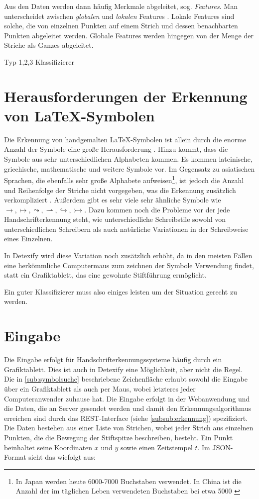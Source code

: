 Aus den Daten werden dann häufig Merkmale abgeleitet, sog. \emph{Features}. Man unterscheidet zwischen \emph{globalen} und \emph{lokalen} Features \cite{Tapia:2007p9160}. Lokale Features sind solche, die von einzelnen Punkten auf einem Strich und dessen benachbarten Punkten abgeleitet werden. Globale Features werden hingegen von der Menge der Striche als Ganzes abgeleitet.

\TODO Typ 1,2,3 Klassifizierer

\section[Herausforderungen]{Herausforderungen der Erkennung von \LaTeX-Symbolen}\label{sec:herausforderungen} Die Erkennung von handgemalten \LaTeX-Symbolen ist allein durch die enorme Anzahl der Symbole eine große Herausforderung \cite{Koerich:2003p1562}. Hinzu kommt, dass die Symbole aus sehr unterschiedlichen Alphabeten kommen. Es kommen lateinische, griechische, mathematische und weitere Symbole vor. Im Gegensatz zu asiatischen Sprachen, die ebenfalls sehr große Alphabete aufweisen\footnote{In Japan werden heute 6000-7000 Buchstaben verwendet. In China ist die Anzahl der im täglichen Leben verwendeten Buchstaben bei etwa 5000 \cite{Jaeger:2003p1097}}, ist jedoch die Anzahl und Reihenfolge der Striche nicht vorgegeben, was die Erkennung zusätzlich verkompliziert \cite{Watt:2005p1816}. Außerdem gibt es sehr viele sehr ähnliche Symbole wie $\rightarrow,\mapsto,\leadsto,\rightharpoonup,\hookrightarrow,\rightarrowtail$. Dazu kommen noch die Probleme vor der jede Handschrifterkennung steht, wie unterschiedliche Schreibstile sowohl von unterschiedlichen Schreibern als auch natürliche Variationen in der Schreibweise eines Einzelnen.

In Detexify wird diese Variation noch zusätzlich erhöht, da in den meisten Fällen eine herkömmliche Computermaus zum zeichnen der Symbole Verwendung findet, statt ein Grafiktablett, das eine gewohnte Stiftführung ermöglicht.

Ein guter Klassifizierer muss also einiges leisten um der Situation gerecht zu werden.

\section{Eingabe} \label{sec:input}

Die Eingabe erfolgt für Handschrifterkennungssysteme häufig durch ein Grafiktablett. Dies ist auch in Detexify eine Möglichkeit, aber nicht die Regel. Die in \ref{sub:symbolsuche} beschriebene Zeichenfläche erlaubt sowohl die Eingabe über ein Grafiktablett als auch per Maus, wobei letzteres jeder Computeranwender zuhause hat. Die Eingabe erfolgt in der Webanwendung und die Daten, die an Server gesendet werden und damit den Erkennungsalgorithmus erreichen sind durch das \ac{REST}-Interface (siehe \ref{subsub:erkennung}) spezifiziert. Die Daten bestehen aus einer Liste von Strichen, wobei jeder Strich aus einzelnen Punkten, die die Bewegung der Stiftspitze beschreiben, besteht. Ein Punkt beinhaltet seine Koordinaten $x$ und $y$ sowie einen Zeitstempel $t$. Im \ac{JSON}-Format sieht das wiefolgt aus:


